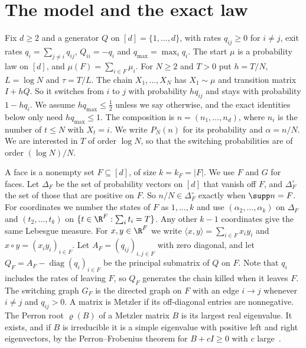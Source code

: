 \section{The model and the exact law}\label{sec:model}

Fix $d\ge2$ and a generator $Q$ on $[d]=\{1,\dots,d\}$, with rates $q_{ij}\ge0$ for $i\ne j$,
exit rates $q_i=\sum_{j\ne i}q_{ij}$, $Q_{ii}=-q_i$ and $q_{\max}=\max_iq_i$. The start $\mu$ is
a probability law on $[d]$, and $\mu(F)=\sum_{i\in F}\mu_i$. For $N\ge2$ and $T>0$ put $h=T/N$,
$L=\log N$ and $\tau=T/L$. The chain $X_1,\dots,X_N$ has $X_1\sim\mu$ and transition matrix
$I+hQ$. So it switches from $i$ to $j$ with probability $hq_{ij}$ and stays with probability
$1-hq_i$. We assume $hq_{\max}\le\frac12$ unless we say otherwise, and the exact identities below
only need $hq_{\max}\le1$. The composition is $n=(n_1,\dots,n_d)$, where $n_i$ is the number of
$t\le N$ with $X_t=i$. We write $P_N(n)$ for its probability and $\alpha=n/N$. We are interested
in $T$ of order $\log N$, so that the switching probabilities are of order $(\log N)/N$.

A face is a nonempty set $F\subseteq[d]$, of size $k=k_F=\lvert F\rvert$. We use $F$ and $G$ for
faces. Let $\Delta_F$ be the set of probability vectors on $[d]$ that vanish off $F$, and
$\Delta_F^\circ$ the set of those that are positive on $F$. So $n/N\in\Delta_F^\circ$ exactly when
$\supp n=F$. For coordinates we number the states of $F$ as $1,\dots,k$ and use
$(\alpha_2,\dots,\alpha_k)$ on $\Delta_F$ and $(t_2,\dots,t_k)$ on $\{t\in\R^F:\sum_it_i=T\}$.
Any other $k-1$ coordinates give the same Lebesgue measure. For $x,y\in\R^F$ we write
$\langle x,y\rangle=\sum_{i\in F}x_iy_i$ and $x\circ y=(x_iy_i)_{i\in F}$. Let
$A_F=(q_{ij})_{i,j\in F}$ with zero diagonal, and let $Q_F=A_F-\operatorname{diag}(q_i)_{i\in F}$
be the principal submatrix of $Q$ on $F$. Note that $q_i$ includes the rates of leaving $F$, so
$Q_F$ generates the chain killed when it leaves $F$. The switching graph $G_F$ is the directed
graph on $F$ with an edge $i\to j$ whenever $i\ne j$ and $q_{ij}>0$. A matrix is Metzler if its
off-diagonal entries are nonnegative. The Perron root $\varrho(B)$ of a Metzler matrix $B$ is its
largest real eigenvalue. It exists, and if $B$ is irreducible it is a simple eigenvalue with
positive left and right eigenvectors, by the Perron--Frobenius theorem for $B+cI\ge0$ with $c$
large~\cite{bermanplemmons1994}.

